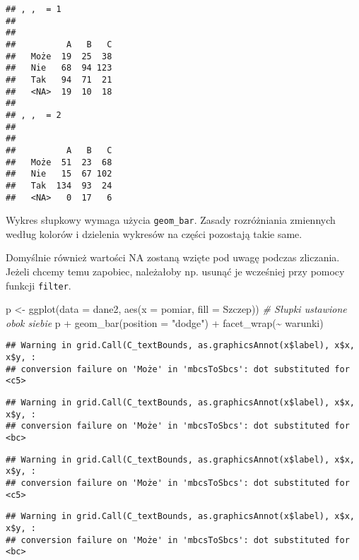 \documentclass[
]{book}
\newenvironment{Shaded}{\begin{snugshade}}{\end{snugshade}}
\newcommand{\AttributeTok}[1]{\textcolor[rgb]{0.77,0.63,0.00}{#1}}
\newcommand{\CommentTok}[1]{\textcolor[rgb]{0.56,0.35,0.01}{\textit{#1}}}
\newcommand{\FunctionTok}[1]{\textcolor[rgb]{0.00,0.00,0.00}{#1}}
\newcommand{\NormalTok}[1]{#1}
\newcommand{\OtherTok}[1]{\textcolor[rgb]{0.56,0.35,0.01}{#1}}
\newcommand{\SpecialCharTok}[1]{\textcolor[rgb]{0.00,0.00,0.00}{#1}}
\newcommand{\StringTok}[1]{\textcolor[rgb]{0.31,0.60,0.02}{#1}}
\begin{document}
\begin{verbatim}
## , ,  = 1
## 
##       
##          A   B   C
##   Może  19  25  38
##   Nie   68  94 123
##   Tak   94  71  21
##   <NA>  19  10  18
## 
## , ,  = 2
## 
##       
##          A   B   C
##   Może  51  23  68
##   Nie   15  67 102
##   Tak  134  93  24
##   <NA>   0  17   6
\end{verbatim}

Wykres słupkowy wymaga użycia \texttt{geom\_bar}. Zasady rozróżniania zmiennych według kolorów i dzielenia wykresów na części pozostają takie same.

Domyślnie również wartości NA zostaną wzięte pod uwagę podczas zliczania. Jeżeli chcemy temu zapobiec, należałoby np. usunąć je wcześniej przy pomocy funkcji \texttt{filter}.

\begin{Shaded}
\begin{Highlighting}[]
\NormalTok{p }\OtherTok{\textless{}{-}} \FunctionTok{ggplot}\NormalTok{(}\AttributeTok{data =}\NormalTok{ dane2, }\FunctionTok{aes}\NormalTok{(}\AttributeTok{x =}\NormalTok{ pomiar, }\AttributeTok{fill =}\NormalTok{ Szczep))}
\CommentTok{\# Słupki ustawione obok siebie}
\NormalTok{p }\SpecialCharTok{+} \FunctionTok{geom\_bar}\NormalTok{(}\AttributeTok{position =} \StringTok{"dodge"}\NormalTok{) }\SpecialCharTok{+} \FunctionTok{facet\_wrap}\NormalTok{(}\SpecialCharTok{\textasciitilde{}}\NormalTok{ warunki)}
\end{Highlighting}
\end{Shaded}

\begin{verbatim}
## Warning in grid.Call(C_textBounds, as.graphicsAnnot(x$label), x$x, x$y, :
## conversion failure on 'Może' in 'mbcsToSbcs': dot substituted for <c5>
\end{verbatim}

\begin{verbatim}
## Warning in grid.Call(C_textBounds, as.graphicsAnnot(x$label), x$x, x$y, :
## conversion failure on 'Może' in 'mbcsToSbcs': dot substituted for <bc>
\end{verbatim}

\begin{verbatim}
## Warning in grid.Call(C_textBounds, as.graphicsAnnot(x$label), x$x, x$y, :
## conversion failure on 'Może' in 'mbcsToSbcs': dot substituted for <c5>
\end{verbatim}

\begin{verbatim}
## Warning in grid.Call(C_textBounds, as.graphicsAnnot(x$label), x$x, x$y, :
## conversion failure on 'Może' in 'mbcsToSbcs': dot substituted for <bc>
\end{verbatim}
\end{document}
